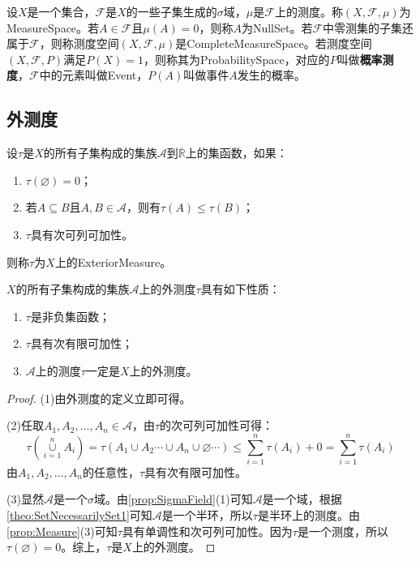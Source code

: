 \begin{definition}
	设$X$是一个集合，$\mathscr{F}$是$X$的一些子集生成的$\sigma$域，$\mu$是$\mathscr{F}$上的测度。称$(X,\mathscr{F},\mu)$为\gls{MeasureSpace}。若$A\in \mathscr{F}$且$\mu(A)=0$，则称$A$为\gls{NullSet}。若$\mathscr{F}$中零测集的子集还属于$\mathscr{F}$，则称测度空间$(X,\mathscr{F},\mu)$是\gls{CompleteMeasureSpace}。若测度空间$(X,\mathscr{F},P)$满足$P(X)=1$，则称其为\gls{ProbabilitySpace}，对应的$P$叫做\textbf{概率测度}，$\mathscr{F}$中的元素叫做\gls{Event}，$P(A)$叫做事件$A$发生的概率。
\end{definition}

\subsection{外测度}
\begin{definition}
	设$\tau$是$X$的所有子集构成的集族$\mathscr{A}$到$\overline{\mathbb{R}}$上的集函数，如果：
	\begin{enumerate}
		\item $\tau(\varnothing)=0$；
		\item 若$A\subseteq B$且$A,B\in\mathscr{A}$，则有$\tau(A)\leqslant\tau(B)$；
		\item $\tau$具有次可列可加性。
	\end{enumerate}
	则称$\tau$为$X$上的\gls{ExteriorMeasure}。
\end{definition}
\begin{property}\label{prop:ExteriorMeasure}
	$X$的所有子集构成的集族$\mathscr{A}$上的外测度$\tau$具有如下性质：
	\begin{enumerate}
		\item $\tau$是非负集函数；
		\item $\tau$具有次有限可加性；
		\item $\mathscr{A}$上的测度$\tau$一定是$X$上的外测度。
	\end{enumerate}
\end{property}
\begin{proof}
	(1)由外测度的定义立即可得。\par
	(2)任取$A_1,A_2,\dots,A_n\in\mathscr{A}$，由$\tau$的次可列可加性可得：
	\begin{equation*}
		\tau\left(\underset{i=1}{\overset{n}{\cup}}A_i\right)=\tau(A_1\cup A_2\cdots\cup A_n\cup\varnothing\cdots)\leqslant\sum_{i=1}^{n}\tau(A_i)+0=\sum_{i=1}^{n}\tau(A_i)
	\end{equation*}
	由$A_1,A_2,\dots,A_n$的任意性，$\tau$具有次有限可加性。\par
	(3)显然$\mathscr{A}$是一个$\sigma$域。由\cref{prop:SigmaField}(1)可知$\mathscr{A}$是一个域，根据\cref{theo:SetNecessarilySet1}可知$\mathscr{A}$是一个半环，所以$\tau$是半环上的测度。由\cref{prop:Measure}(3)可知$\tau$具有单调性和次可列可加性。因为$\tau$是一个测度，所以$\tau(\varnothing)=0$。综上，$\tau$是$X$上的外测度。
\end{proof}
